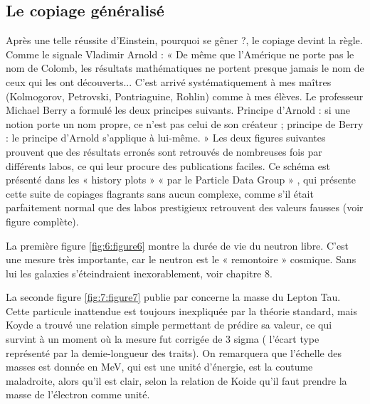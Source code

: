 \documentclass[a4paper,12pt]{article}
\begin{document}
\subsection {Le copiage généralisé}

Après une telle réussite d’Einstein, pourquoi se gêner ?, le copiage devint la règle. Comme le signale Vladimir Arnold : « De même que l’Amérique ne porte pas le nom de Colomb, les résultats mathématiques ne portent presque jamais le nom de ceux qui les ont découverts... C’est arrivé systématiquement à mes maîtres (Kolmogorov, Petrovski, Pontriaguine, Rohlin) comme à mes élèves. Le professeur Michael Berry a formulé les deux principes suivants. Principe d’Arnold : si une notion porte un nom propre, ce n’est pas celui de son créateur ; principe de Berry : le principe d’Arnold s'applique à lui-même. » 
Les deux figures suivantes prouvent que des résultats erronés sont retrouvés de nombreuses fois par différents labos, ce qui leur procure des publications faciles. Ce schéma est présenté dans les « history plots » « par le Particle Data Group » \cite{Tanabashi}, qui présente cette suite de copiages flagrants sans aucun complexe, comme s’il était parfaitement normal que des labos prestigieux retrouvent des valeurs fausses (voir figure complète). 

La première figure \ref{fig:6:figure6} montre la durée de vie du neutron libre. C’est une mesure très importante, car le neutron est le « remontoire » cosmique. Sans lui les galaxies s’éteindraient inexorablement, voir chapitre 8.





La seconde figure \ref{fig:7:figure7} publie par \cite{Tanabashi} concerne la masse du Lepton Tau. Cette particule inattendue est toujours inexpliquée par la théorie standard, mais Koyde a trouvé une relation simple permettant de prédire sa valeur, ce qui survint à un moment où la mesure fut corrigée de 3 sigma ( l’écart type représenté par la demie-longueur des traits). On remarquera que l’échelle des masses est donnée en MeV, qui est une unité d’énergie, est la coutume maladroite, alors qu’il est clair, selon la relation de Koide qu’il faut prendre la masse de l’électron comme unité. 
\end{document}
